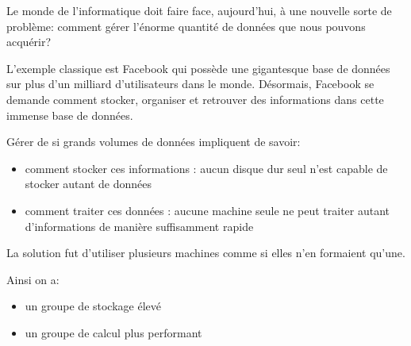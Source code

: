 
Le monde de l'informatique doit faire face, aujourd'hui, à une nouvelle sorte de problème: comment
gérer l'énorme quantité de données que nous pouvons acquérir? 

\noindent
L'exemple classique est Facebook qui possède une gigantesque base de données sur plus d'un milliard d'utilisateurs dans le monde. Désormais, Facebook se demande comment stocker, organiser et retrouver des informations dans cette immense base de données.

\noindent Gérer de si grands volumes de données impliquent de savoir:
\begin{itemize}
\item comment stocker ces informations : aucun disque dur seul n'est capable de stocker autant de données
\item comment traiter ces données : aucune machine seule ne peut traiter autant d'informations de manière suffisamment rapide
\end{itemize}
\bigskip
\noindent La solution fut d'utiliser plusieurs machines comme si elles 
n'en formaient qu'une.\par
Ainsi on a:
\begin{itemize}
\item un groupe de stockage élevé
\item un groupe de calcul plus performant
\end{itemize}
\vspace{1\baselineskip}

